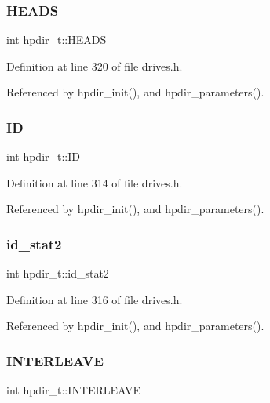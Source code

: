 \subsubsection{\texorpdfstring{H\+E\+A\+DS}{HEADS}}
{\footnotesize\ttfamily int hpdir\+\_\+t\+::\+H\+E\+A\+DS}



Definition at line 320 of file drives.\+h.



Referenced by hpdir\+\_\+init(), and hpdir\+\_\+parameters().

\mbox{\label{structhpdir__t_afe1c714728ae2b560621b54c5af129a9}} 
\subsubsection{\texorpdfstring{ID}{ID}}
{\footnotesize\ttfamily int hpdir\+\_\+t\+::\+ID}



Definition at line 314 of file drives.\+h.



Referenced by hpdir\+\_\+init(), and hpdir\+\_\+parameters().

\mbox{\label{structhpdir__t_ac44ef1313054831824d2840202e554aa}} 
\subsubsection{\texorpdfstring{id\+\_\+stat2}{id\_stat2}}
{\footnotesize\ttfamily int hpdir\+\_\+t\+::id\+\_\+stat2}



Definition at line 316 of file drives.\+h.



Referenced by hpdir\+\_\+init(), and hpdir\+\_\+parameters().

\mbox{\label{structhpdir__t_a329cc03f36e88365e6d7dc87194a1ed4}} 
\subsubsection{\texorpdfstring{I\+N\+T\+E\+R\+L\+E\+A\+VE}{INTERLEAVE}}
{\footnotesize\ttfamily int hpdir\+\_\+t\+::\+I\+N\+T\+E\+R\+L\+E\+A\+VE}



